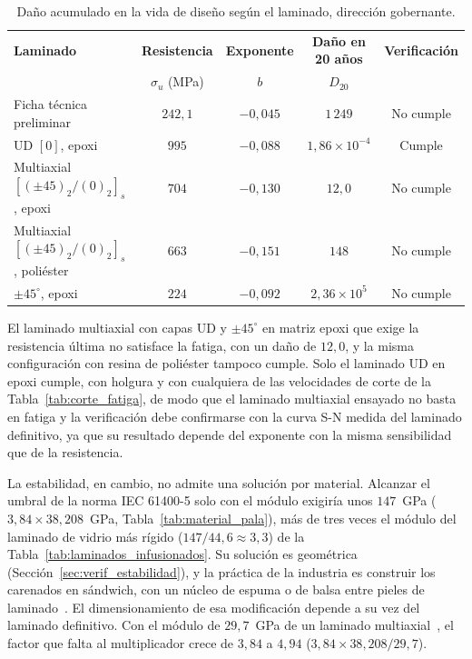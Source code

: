 \begin{table}[H]
    \centering
    \caption{Daño acumulado en la vida de diseño según el laminado, dirección gobernante.}
    \label{tab:fatiga_laminados}
    \begin{tabular}{>{\raggedright\arraybackslash}p{4.6cm}cccc}
        \hline
        \textbf{Laminado} & \textbf{Resistencia} & \textbf{Exponente} & \textbf{Daño en 20 años} & \textbf{Verificación} \\
        & $\sigma_u$ (MPa) & $b$ & $D_{20}$ & \\
        \hline
        Ficha técnica preliminar & $242{,}1$ & $-0{,}045$ & $1\,249$ & No cumple\\
        UD $[0]$, epoxi & $995$ & $-0{,}088$ & $1{,}86 \times 10^{-4}$ & Cumple\\
        Multiaxial $[(\pm 45)_2/(0)_2]_s$, epoxi & $704$ & $-0{,}130$ & $12{,}0$ & No cumple\\
        Multiaxial $[(\pm 45)_2/(0)_2]_s$, poliéster & $663$ & $-0{,}151$ & $148$ & No cumple\\
        $\pm 45^\circ$, epoxi & $224$ & $-0{,}092$ & $2{,}36 \times 10^{5}$ & No cumple\\
        \hline
    \end{tabular}
\end{table}

El laminado multiaxial con capas UD y $\pm 45^\circ$ en matriz epoxi que exige la resistencia última no satisface la fatiga, con un daño de $12{,}0$, y la misma configuración con resina de poliéster tampoco cumple. Solo el laminado UD en epoxi cumple, con holgura y con cualquiera de las velocidades de corte de la Tabla~\ref{tab:corte_fatiga}, de modo que el laminado multiaxial ensayado no basta en fatiga y la verificación debe confirmarse con la curva S-N medida del laminado definitivo, ya que su resultado depende del exponente con la misma sensibilidad que de la resistencia.

La estabilidad, en cambio, no admite una solución por material. Alcanzar el umbral de la norma IEC 61400-5 solo con el módulo exigiría unos $147$~GPa ($3{,}84 \times 38{,}208$~GPa, Tabla~\ref{tab:material_pala}), más de tres veces el módulo del laminado de vidrio más rígido ($147/44{,}6 \approx 3{,}3$) de la Tabla~\ref{tab:laminados_infusionados}. Su solución es geométrica (Sección~\ref{sec:verif_estabilidad}), y la práctica de la industria es construir los carenados en sándwich, con un núcleo de espuma o de balsa entre pieles de laminado~\parencite{Mishnaevsky2017}. El dimensionamiento de esa modificación depende a su vez del laminado definitivo. Con el módulo de $29{,}7$~GPa de un laminado multiaxial~\parencite{Samborsky2010}, el factor que falta al multiplicador crece de $3{,}84$ a $4{,}94$ ($3{,}84 \times 38{,}208/29{,}7$).
